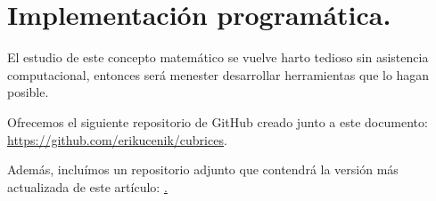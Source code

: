 \section{Implementación programática.}

El estudio de este concepto matemático se vuelve harto tedioso sin asistencia computacional, entonces será menester desarrollar herramientas que lo hagan posible.

Ofrecemos el siguiente repositorio de GitHub creado junto a este documento: \href{https://github.com/erikucenik/cubrices}{https://github.com/erikucenik/cubrices}.

Además, incluímos un repositorio adjunto que contendrá la versión más actualizada de este artículo: \href{https://github.com/erikucenik/cubrices-paper}.

